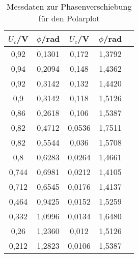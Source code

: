 



%


\begin{table}
  \centering
  \caption{Messdaten zur Phasenverschiebung für den Polarplot}
  \label{tab:phasenverschiebungpolar}
  \begin{tabular}{c c c c c}
    \toprule
     $U_c$/V  &	$\phi$/rad		&      $U_c$/V  &	$\phi$/rad			  \\
          \midrule
          0,92       &     0,1301     &       0,172      &     1,3792  \\
          0,94       &     0,2094     &       0,148      &     1,4362  \\
          0,92       &     0,3142     &       0,132      &     1,4420  \\
          0,9        &     0,3142     &       0,118      &     1,5126  \\
          0,86       &     0,2618     &       0,106      &     1,5387  \\
          0,82       &     0,4712     &       0,0536     &     1,7511  \\
          0,82       &     0,5544     &       0,036      &     1,5708  \\
          0,8        &     0,6283     &       0,0264     &     1,4661  \\
          0,744      &     0,6981     &       0,0212     &     1,4105  \\
          0,712      &     0,6545     &       0,0176     &     1,4137  \\
          0,464      &     0,9425     &       0,0152     &     1,5259  \\
          0,332      &     1,0996     &       0,0134     &     1,6480  \\
          0,26       &     1,2360     &       0,012      &     1,5126  \\
          0,212      &     1,2823     &       0,0106     &     1,5387  \\
    \bottomrule
  \end{tabular}
\end{table}

%
